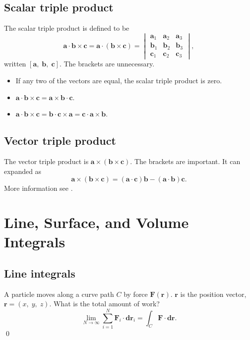 \subsection{Scalar triple product}
The scalar triple product is defined to be 
\begin{equation}
    \bm{a} \cdot \bm{b} \times \bm{c}
    =
    \bm{a} \cdot (\bm{b} \times \bm{c})
    =
        \begin{vmatrix}
            \bm{a}_1 & \bm{a}_2 & \bm{a}_3 \\
            \bm{b}_1 & \bm{b}_2 & \bm{b}_3 \\
            \bm{c}_1 & \bm{c}_2 & \bm{c}_3 
        \end{vmatrix}
    ,
\end{equation}
written $[\bm{a},\;\bm{b},\;\bm{c}]$. The brackets are unnecessary.

\begin{itemize}
    \item If any two of the vectors are equal, the scalar triple product is zero.
    \item $ \bm{a} \cdot \bm{b} \times \bm{c}
            = \bm{a} \times \bm{b} \cdot \bm{c} $.
    \item $ \bm{a} \cdot \bm{b} \times \bm{c}
            = \bm{b} \cdot \bm{c} \times \bm{a} 
            = \bm{c} \cdot \bm{a} \times \bm{b} $.
\end{itemize}

\subsection{Vector triple product}
The vector triple product is 
$\bm{a} \times (\bm{b}\times \bm{c})$. 
The brackets are important. 
It can expanded as
\begin{equation}
    \bm{a} \times (\bm{b}\times \bm{c})
    = (\bm{a} \cdot \bm{c}) \bm{b}
    - (\bm{a} \cdot \bm{b}) \bm{c}.
\end{equation}
More information see \citealp[pg.~16]{matthews1998vector}.

\section{Line, Surface, and Volume Integrals}
\subsection{Line integrals}
\begin{example}
    A particle moves along a curve path $C$ by force $\bm{F}(\bm{r})$. 
    $\bm{r}$ is the position vector, $\bm{r} = (x,\;y,\;z)$. 
    What is the total amount of work?
    \begin{equation}
        \lim_{N\to \infty} \sum_{i=1}^N \bm{F}_i \cdot \bm{dr}_i
        = \int_C \bm{F} \cdot \bm{dr}.
    \end{equation}
    \qed
\end{example}
